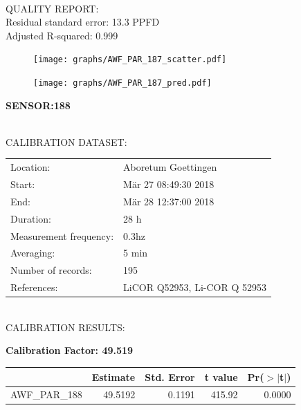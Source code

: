 \documentclass[oneside]{report}
\begin{document}
\hrulefill\\
QUALITY REPORT:\\
Residual standard error: 13.3 PPFD\\
Adjusted R-squared: 0.999



\begin{figure}[H]
  \centering
  \texttt{[image: graphs/AWF\_PAR\_187\_scatter.pdf]}
\end{figure}




\begin{figure}[H]
  \centering
  \texttt{[image: graphs/AWF\_PAR\_187\_pred.pdf]}
\end{figure}

\pagebreak


\begin{center}
\large{\textbf{SENSOR:188}}\\
\end{center}

\hrulefill\\
CALIBRATION DATASET:\\
\begin{table}[h!]
  \centering
  \label{tab:table1}
  \begin{tabular}{ll}
    Location: & Aboretum Goettingen\\ 
    
    
    Start:  & Mär 27 08:49:30 2018 \\
    End:   & Mär 28 12:37:00 2018\\ 
    Duration: & 28 h\\
    Measurement frequency: & 0.3hz\\
    Averaging:  &5 min\\
    Number of records: & 195 \\
    References: & LiCOR Q52953, Li-COR Q 52953 \\
  \end{tabular}
\end{table}

\hrulefill\\
CALIBRATION RESULTS:\\


\begin{center}
\textbf{\large{Calibration Factor: 49.519}}\\
\end{center}
\begin{table}[ht]
\centering
\begin{tabular}{rrrrr}
  \hline
 & Estimate & Std. Error & t value & Pr($>$$|$t$|$) \\ 
  \hline
AWF\_PAR\_188 & 49.5192 & 0.1191 & 415.92 & 0.0000 \\ 
   \hline
\end{tabular}
\end{table}
\end{document}
